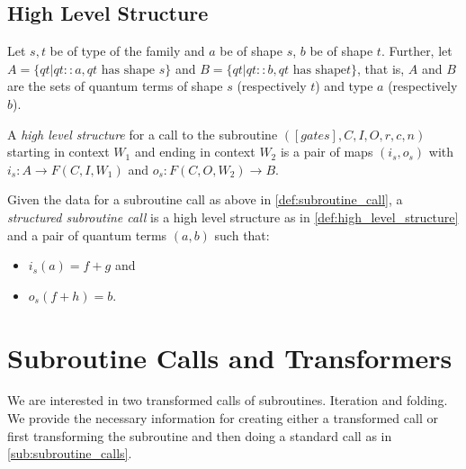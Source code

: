 
\subsection{High Level Structure} %
\label{sub:high_level_structure}

Let $s,t$ be of type of the family  and $a$ be of shape $s$, $b$ be of shape $t$.
Further, let $A = \{qt|qt::a, qt \text{ has shape }s\}$ and $B = \{qt|qt::b, qt \text{ has shape
}t\}$, that is, $A$ and $B$ are the sets of quantum terms of shape $s$ (respectively $t$) and type
$a$ (respectively $b$).

\begin{definition}\label{def:high_level_structure}
  A \emph{high level structure} for a call to the subroutine $([gates],C,I,O,r,c,n)$ starting in
  context $W_1$ and ending in context $W_2$ is a pair of maps $(i_s,o_s)$ with $i_s:A \to
  F(C,I,W_1)$ and $o_s:F(C,O,W_2)\to B$.
\end{definition}

\begin{definition}\label{def:structured_subroutine_call}
  Given the data for a subroutine call as above in \vref{def:subroutine_call}, a \emph{structured
  subroutine call} is a high level structure as in \vref{def:high_level_structure} and a pair of
  quantum terms $(a,b)$ such that:
  \begin{itemize}
    \item $i_s(a) = f+g$ and
    \item $o_s(f+h) = b$.
  \end{itemize}
\end{definition}



\section{Subroutine Calls and Transformers} %
\label{sec:subroutine_calls_and_transformers}

We are interested in two transformed calls of subroutines. Iteration and folding. We provide the
necessary information for creating either a transformed call or first transforming the subroutine
and then doing a standard call as in \vref{sub:subroutine_calls}.

